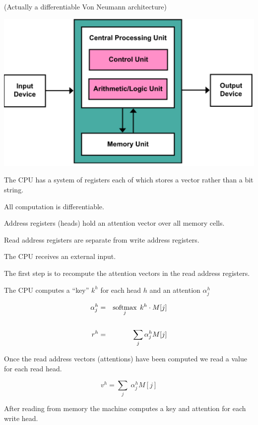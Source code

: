 {\vfill
(Actually a differentiable Von Neumann architecture)

\vfill
\centerline{\includegraphics[width = 6in]{../images/VNA}}


The CPU has a system of registers each of which stores a vector rather than a bit string.

\vfill
All computation is differentiable.

\vfill
Address registers (heads) hold an attention vector over all memory cells.

\vfill
Read address registers are separate from write address registers.


\vfill
The CPU receives an external input.

\vfill
The first step is to recompute the attention vectors in the read address registers.

\vfill
The CPU computes a ``key'' $k^h$ for each head $h$ and an attention $\alpha_j^h$

\begin{eqnarray*}
  \alpha^h_j & = & \operatorname*{softmax}_j\;k^h \cdot M[j] \\
  \\
  r^h & = & \sum_j \alpha_j^h M[j]
\end{eqnarray*}


Once the read address vectors (attentions) have been computed we read a value for each read head.

\vfill
$$v^h = \sum_j \;\alpha^h_j M[j]$$

After reading from memory the machine computes a key and attention for each write head.

}
